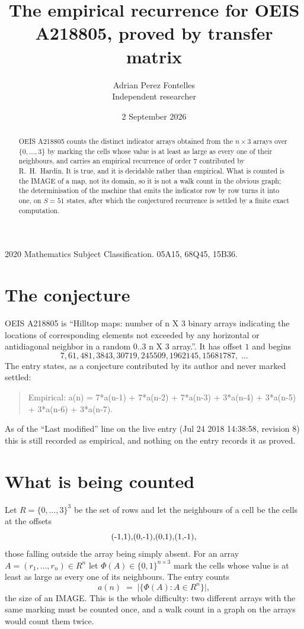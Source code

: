 \documentclass[11pt,a4paper]{article}
\title{The empirical recurrence for OEIS A218805, proved by transfer matrix}
\author{Adrian Perez Fontelles\\ \small Independent researcher}
\date{2 September 2026}
\theoremstyle{plain}
\theoremstyle{definition}
\begin{document}
\maketitle

\begin{abstract}
OEIS A218805 counts the distinct indicator arrays obtained from the $n\times3$ arrays over
$\{0,\dots,3\}$ by marking the cells whose value is at least as large as every one of their neighbours, and carries an
empirical recurrence of order $7$ contributed by R.~H.~Hardin. It is true, and it is
decidable rather than empirical. What is counted is the IMAGE of a map, not its domain, so it
is not a walk count in the obvious graph; the determinisation of the machine that emits the
indicator row by row turns it into one, on $S=51$ states, after which the conjectured
recurrence is settled by a finite exact computation.
\end{abstract}

\noindent\small 2020 Mathematics Subject Classification. 05A15, 68Q45, 15B36.\normalsize

\section{The conjecture}

OEIS A218805 is ``Hilltop maps: number of n X 3 binary arrays indicating the locations of corresponding elements not exceeded by any horizontal or antidiagonal neighbor in a random 0..3 n X 3 array.''. It has offset $1$ and begins
\[
7, 61, 481, 3843, 30719, 245509, 1962145, 15681787,\ \dots
\]
The entry states, as a conjecture contributed by its author and never marked settled:
\begin{quote}
Empirical: a(n) = 7*a(n-1) + 7*a(n-2) + 7*a(n-3) + 3*a(n-4) + 3*a(n-5) + 3*a(n-6) + 3*a(n-7).
\end{quote}
As of the ``Last modified'' line on the live entry (Jul 24 2018 14:38:58, revision 8) this is still
recorded as empirical, and nothing on the entry records it as proved.

\section{What is being counted}

Let $R=\{0,\dots,3\}^{3}$ be the set of rows and let the neighbours of a cell be the
cells at the offsets
\[
$(-1,1)$, $(0,-1)$, $(0,1)$, $(1,-1)$,
\]
those falling outside the array being simply absent. For an array
$A=(r_1,\dots,r_n)\in R^n$ let $\Phi(A)\in\{0,1\}^{n\times3}$ mark the cells whose value
is at least as large as every one of its neighbours. The entry counts
\[
a(n)\;=\;\bigl|\{\Phi(A):A\in R^n\}\bigr| ,
\]
the size of an IMAGE. This is the whole difficulty: two different arrays with the same marking
must be counted once, and a walk count in a graph on the arrays would count them twice.
\end{document}
